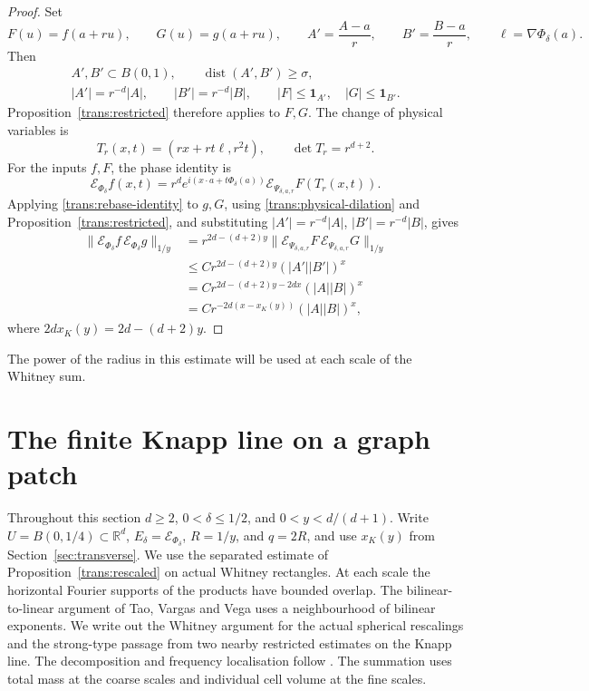 \documentclass[11pt]{article}
\numberwithin{equation}{section}
\newcommand{\R}{\mathbb{R}}
\newcommand{\norm}[1]{\lVert #1\rVert}
\newcommand{\dist}{\operatorname{dist}}
\begin{document}
\begin{proof}
Set
\[
 F(u)=f(a+ru),\qquad G(u)=g(a+ru),\qquad
 A'=\frac{A-a}{r},\qquad B'=\frac{B-a}{r},\qquad
 \ell=\nabla\Phi_\delta(a).
\]
Then
\[
 \begin{gathered}
 A',B'\subset B(0,1),\qquad \dist(A',B')\geq\sigma,\\
 |A'|=r^{-d}|A|,\qquad |B'|=r^{-d}|B|,\qquad
 |F|\leq\mathbf1_{A'},\quad |G|\leq\mathbf1_{B'}.
 \end{gathered}
\]
Proposition~\ref{trans:restricted} therefore applies to \(F,G\).
The change of physical variables is
\begin{equation}\label{trans:physical-dilation}
 T_r(x,t)=(rx+rt\ell,r^2t),\qquad \det T_r=r^{d+2}.
\end{equation}
For the inputs \(f,F\), the phase identity is
\begin{equation}\label{trans:rebase-identity}
 \mathcal E_{\Phi_\delta}f(x,t)
 =r^d e^{i(x\cdot a+t\Phi_\delta(a))}
      \mathcal E_{\Psi_{\delta,a,r}}F(T_r(x,t)).
\end{equation}
Applying \eqref{trans:rebase-identity} to \(g,G\), using
\eqref{trans:physical-dilation} and Proposition~\ref{trans:restricted},
and substituting \(|A'|=r^{-d}|A|\), \(|B'|=r^{-d}|B|\), gives
\begin{align*}
 \norm{\mathcal E_{\Phi_\delta}f\,\mathcal E_{\Phi_\delta}g}_{1/y}
 &=r^{2d-(d+2)y}
   \norm{\mathcal E_{\Psi_{\delta,a,r}}F\,
         \mathcal E_{\Psi_{\delta,a,r}}G}_{1/y}\\
 &\leq C r^{2d-(d+2)y}(|A'||B'|)^x\\
 &=C r^{2d-(d+2)y-2dx}(|A||B|)^x\\
 &=C r^{-2d(x-x_K(y))}(|A||B|)^x,
\end{align*}
where \(2dx_K(y)=2d-(d+2)y\).
\end{proof}

The power of the radius in this estimate will be used at each scale
of the Whitney sum.


\section{The finite Knapp line on a graph patch}\label{kn:section}

Throughout this section \(d\ge2\), \(0<\delta\le1/2\), and
\(0<y<d/(d+1)\). Write \(U=B(0,1/4)\subset\R^d\),
\(E_\delta=\mathcal E_{\Phi_\delta}\), \(R=1/y\), and \(q=2R\),
and use \(x_K(y)\) from Section~\ref{sec:transverse}.
We use the separated estimate of
Proposition~\ref{trans:rescaled} on actual Whitney rectangles. At each
scale the horizontal Fourier supports of the products have bounded
overlap. The bilinear-to-linear argument of Tao, Vargas and Vega
\cite[Theorem~2.2]{TVV} uses a neighbourhood of bilinear exponents. We
write out the Whitney argument for the actual spherical rescalings
and the strong-type passage from two nearby restricted estimates on
the Knapp line. The decomposition and frequency localisation follow
\cite[Section~2.5 and Lemma~6.1]{TVV}. The summation uses total mass
at the coarse scales and individual cell volume at the fine scales.
\end{document}

